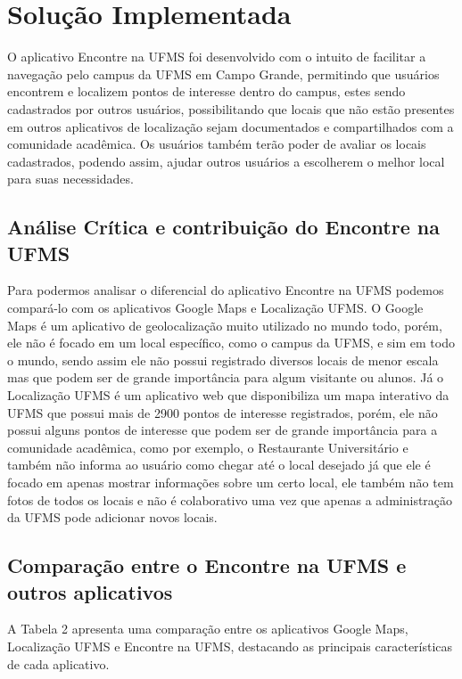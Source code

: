 \section{Solução Implementada}

    O aplicativo Encontre na UFMS foi desenvolvido com o intuito de facilitar a navegação pelo campus da UFMS em Campo Grande, permitindo que usuários encontrem e localizem pontos de interesse dentro do campus, estes sendo cadastrados por outros usuários, possibilitando que locais que não estão presentes em outros aplicativos de localização sejam documentados e compartilhados com a comunidade acadêmica. Os usuários também terão poder de avaliar os locais cadastrados, podendo assim, ajudar outros usuários a escolherem o melhor local para suas necessidades.

\subsection{Análise Crítica e contribuição do Encontre na UFMS}
    Para podermos analisar o diferencial do aplicativo Encontre na UFMS podemos compará-lo com os aplicativos Google Maps e Localização UFMS. O Google Maps é um aplicativo de geolocalização muito utilizado no mundo todo, porém, ele não é focado em um local específico, como o campus da UFMS, e sim em todo o mundo, sendo assim ele não possui registrado diversos locais de menor escala mas que podem ser de grande importância para algum visitante ou alunos. Já o Localização UFMS é um aplicativo web que disponibiliza um mapa interativo da UFMS que possui mais de 2900 pontos de interesse registrados, porém, ele não possui alguns pontos de interesse que podem ser de grande importância para a comunidade acadêmica, como por exemplo, o Restaurante Universitário e também não informa ao usuário como chegar até o local desejado já que ele é focado em apenas mostrar informações sobre um certo local, ele também não tem fotos de todos os locais e não é colaborativo uma vez que apenas a administração da UFMS pode adicionar novos locais.

\newpage

\subsection{Comparação entre o Encontre na UFMS e outros aplicativos}
    A Tabela 2 apresenta uma comparação entre os aplicativos Google Maps, Localização UFMS e Encontre na UFMS, destacando as principais características de cada aplicativo.

